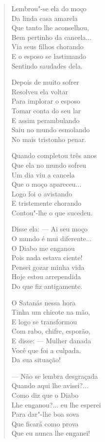 \begin{verse}
Lembrou"-se ela do moço \\
Da linda casa amarela \\
Que tanto lhe aconselhou, \\
Bem pertinho da cancela... \\
Via seus filhos chorando \\
E o esposo se lastimando \\
Sentindo saudades dela. 

Depois de muito sofrer \\
Resolveu ela voltar \\
Para implorar o esposo \\
Tomar conta do seu lar \\
E assim perambulando \\
Saiu no mundo esmolando\\
No mais tristonho penar. 

Quando completou três anos \\
Que ela no mundo sofreu \\
Um dia viu a cancela \\
Que o moço apareceu... \\
Logo foi o avistando \\
E tristemente chorando \\
Contou"-lhe o que sucedeu. 


Disse ela: ---  Ai seu moço \\
O mundo é mui diferente... \\
O Diabo me enganou \\
Pois nada estava ciente! \\
Pensei gozar minha vida \\
Hoje estou arrependida \\
Do que fiz antigamente. 

O Satanás nessa hora \\
Tinha um chicote na mão, \\
E logo se transformou \\
Com rabo, chifre, esporão, \\
E disse: ---  Mulher danada \\
Você que foi a culpada. \\
Da sua situação! 

---  Não se lembra desgraçada \\
Quando aqui lhe avisei?... \\
Como diz que o Diabo \\
Lhe enganou?... eu lhe esperei \\
Para dar"-lhe boa sova \\
Que ficará como prova \\
Que eu nunca lhe enganei! 


\end{verse}
